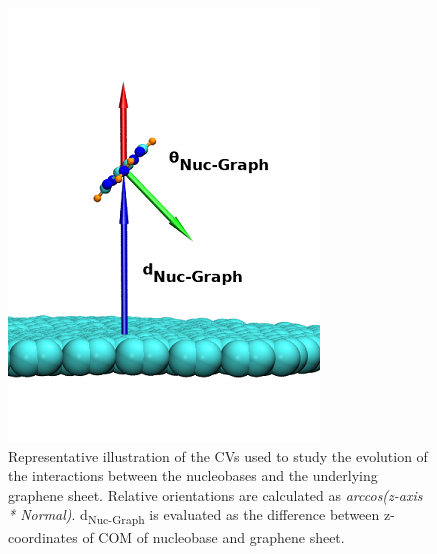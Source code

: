     \begin{figure}
        \centering
        \includegraphics{Chapter1/Figures/cv.png}
        \caption[Representative illustration of the CVs used to study the evolution of the interactions between the nucleobases and the underlying graphene sheet]{Representative illustration of the CVs used to study the evolution of the interactions between the nucleobases and the underlying graphene sheet. Relative orientations are calculated as \textit{arccos(z-axis * Normal)}. d\textsubscript{Nuc-Graph} is evaluated as the difference between z-coordinates of COM of nucleobase and graphene sheet.}
    \end{figure}

